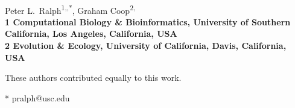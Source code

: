 \documentclass[10pt,letterpaper]{article}
\date{}
\begin{document}
\vspace*{0.35in}

\begin{flushleft}
{\Large
\textbf{}
}
\newline
\\
Peter L.\ Ralph\textsuperscript{1,\Yinyang,*},
Graham Coop\textsuperscript{2,\Yinyang}
\\
\bigskip
\bf{1} Computational Biology \& Bioinformatics, University of Southern California, Los Angeles, California, USA
\\
\bf{2} Evolution \& Ecology, University of California, Davis, California, USA
\\
\bigskip

% 
%
\Yinyang These authors contributed equally to this work.





* pralph@usc.edu

\end{flushleft}
\end{document}
